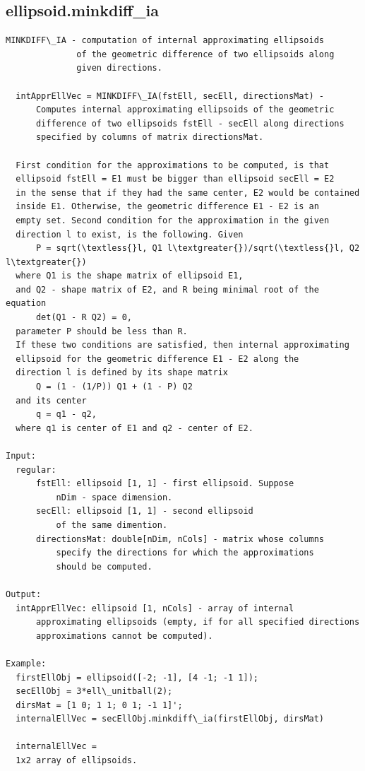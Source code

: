 \documentclass[letterpaper,10pt,english]{sphinxmanual}
\begin{document}
\subsection{ellipsoid.minkdiff\_ia}
\label{chap_functions:ellipsoid-minkdiff-ia}
\begin{Verbatim}[commandchars=\\\{\}]
MINKDIFF\_IA - computation of internal approximating ellipsoids
              of the geometric difference of two ellipsoids along
              given directions.

  intApprEllVec = MINKDIFF\_IA(fstEll, secEll, directionsMat) -
      Computes internal approximating ellipsoids of the geometric
      difference of two ellipsoids fstEll - secEll along directions
      specified by columns of matrix directionsMat.

  First condition for the approximations to be computed, is that
  ellipsoid fstEll = E1 must be bigger than ellipsoid secEll = E2
  in the sense that if they had the same center, E2 would be contained
  inside E1. Otherwise, the geometric difference E1 - E2 is an
  empty set. Second condition for the approximation in the given
  direction l to exist, is the following. Given
      P = sqrt(\textless{}l, Q1 l\textgreater{})/sqrt(\textless{}l, Q2 l\textgreater{})
  where Q1 is the shape matrix of ellipsoid E1,
  and Q2 - shape matrix of E2, and R being minimal root of the equation
      det(Q1 - R Q2) = 0,
  parameter P should be less than R.
  If these two conditions are satisfied, then internal approximating
  ellipsoid for the geometric difference E1 - E2 along the
  direction l is defined by its shape matrix
      Q = (1 - (1/P)) Q1 + (1 - P) Q2
  and its center
      q = q1 - q2,
  where q1 is center of E1 and q2 - center of E2.

Input:
  regular:
      fstEll: ellipsoid [1, 1] - first ellipsoid. Suppose
          nDim - space dimension.
      secEll: ellipsoid [1, 1] - second ellipsoid
          of the same dimention.
      directionsMat: double[nDim, nCols] - matrix whose columns
          specify the directions for which the approximations
          should be computed.

Output:
  intApprEllVec: ellipsoid [1, nCols] - array of internal
      approximating ellipsoids (empty, if for all specified directions
      approximations cannot be computed).

Example:
  firstEllObj = ellipsoid([-2; -1], [4 -1; -1 1]);
  secEllObj = 3*ell\_unitball(2);
  dirsMat = [1 0; 1 1; 0 1; -1 1]';
  internalEllVec = secEllObj.minkdiff\_ia(firstEllObj, dirsMat)

  internalEllVec =
  1x2 array of ellipsoids.
\end{Verbatim}
\end{document}
